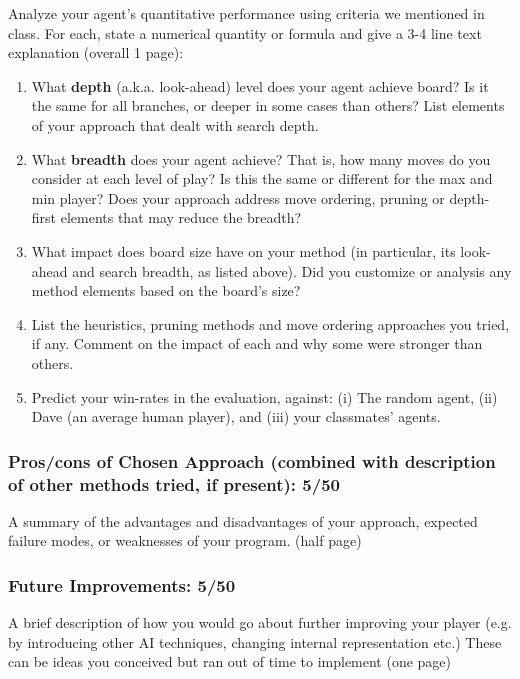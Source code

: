 \documentclass[12pt, letterpaper]{article}
\begin{document}
        Analyze your agent's quantitative performance using  criteria we mentioned in class. For each, state a numerical quantity or formula and give a 3-4 line text explanation (overall 1 page):
        \begin{enumerate}
            \item What \textbf{depth} (a.k.a. look-ahead) level does your agent achieve  board? Is it the same for all branches, or deeper in some cases than others? List elements of your approach that dealt with search depth.
            \item What \textbf{breadth} does your agent achieve? That is, how many moves do you consider at each level of play? Is this the same or different for the max and min player? Does your approach address move ordering, pruning or  depth-first elements that may reduce the breadth?
            \item What impact does board size have on your method (in particular, its look-ahead and search breadth, as listed above). Did you customize or analysis any method elements based on the board's size?
            \item List the heuristics, pruning methods and move ordering approaches you tried, if any. Comment on the impact of each and why some were stronger than others.
            \item Predict your win-rates in the evaluation, against: (i) The random agent, (ii) Dave (an average human player), and (iii) your classmates' agents.
        \end{enumerate}
    
\subsubsection*{Pros/cons of Chosen Approach (combined with description of other methods tried, if present): 5/50}
    
    A summary of the advantages and disadvantages of your approach, expected failure modes, or weaknesses of your program. (half page)
    
\subsubsection*{Future Improvements: 5/50}

    A brief description of how you would go about further improving your player (e.g. by introducing other AI techniques, changing internal representation etc.) These can be ideas you conceived but ran out of time to implement (one page)




\end{document}
